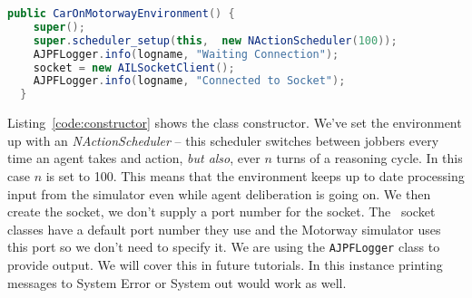 \documentclass[a4]{article}
\begin{document}
\begin{lstlisting}[float,caption=Constructor,basicstyle=\sffamily,language=Java,label=code:constructor,style=easslisting]
  public CarOnMotorwayEnvironment() {
    super();
    super.scheduler_setup(this,  new NActionScheduler(100));
    AJPFLogger.info(logname, "Waiting Connection");
    socket = new AILSocketClient();
    AJPFLogger.info(logname, "Connected to Socket");
  }
\end{lstlisting}
Listing~\ref{code:constructor} shows the class constructor.  We've set the environment up with an \emph{NActionScheduler} -- this scheduler switches between jobbers every time an agent takes and action, \emph{but also}, ever $n$ turns of a reasoning cycle.  In this case $n$ is set to 100.  This means that the environment keeps up to date processing input from the simulator even while agent deliberation is going on.  We then create the socket, we don't supply a port number for the socket.  The \ail\ socket classes have a default port number they use and the Motorway simulator uses this port so we don't need to specify it.  We are using the \texttt{AJPFLogger} class to provide output.  We will cover this in future tutorials.  In this instance printing messages to System Error or System out would work as well.
\end{document}
